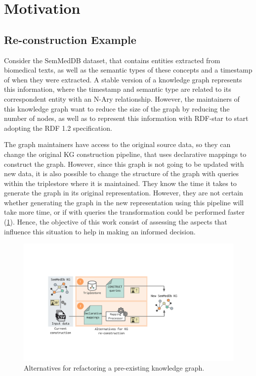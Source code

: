 
\section{Motivation}
\label{sec:chp6-1_mot-example}

\subsection{Re-construction Example}


Consider the SemMedDB dataset, that contains entities extracted from biomedical texts, as well as the semantic types of these concepts and a timestamp of when they were extracted. A stable version of a knowledge graph represents this information, where the timestamp and semantic type are related to its correspondent entity with an N-Ary relationship. However, the maintainers of this knowledge graph want to reduce the size of the graph by reducing the number of nodes, as well as to represent this information with RDF-star to start adopting the RDF 1.2 specification.

The graph maintainers have access to the original source data, so they can change the original KG construction pipeline, that uses declarative mappings to construct the graph. However, since this graph is not going to be updated with new data, it is also possible to change the structure of the graph with queries within the triplestore where it is maintained. They know the time it takes to generate the graph in its original representation. However, they are not certain whether generating the graph in the new representation using this pipeline will take more time, or if with queries the transformation could be performed faster (\cref{fig:chp6-1_mot-example}). Hence, the objective of this work consist of assessing the aspects that influence this situation to help in making an informed decision.


\begin{figure}[b!]
    \centering
    \includegraphics[width=0.8\linewidth]{figures/chp6-1_motivating-example.pdf}
    \caption[KG re-construction alternatives]{Alternatives for refactoring a pre-existing knowledge graph.}
    \label{fig:chp6-1_mot-example}
\end{figure}



